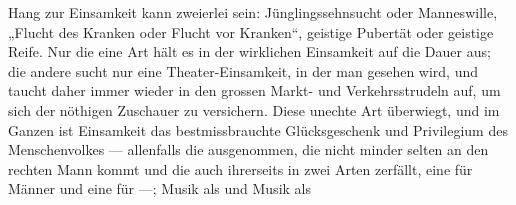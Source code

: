 Hang zur Einsamkeit kann zweierlei sein: Jünglingssehnsucht oder Manneswille, „Flucht des Kranken oder Flucht vor Kranken“, geistige Pubertät oder geistige Reife. Nur die eine Art hält es in der wirklichen Einsamkeit auf die Dauer aus; die andere sucht nur eine Theater-Einsamkeit, in der man gesehen wird, und taucht daher immer wieder in den grossen Markt- und Verkehrsstrudeln auf, um sich der nöthigen Zuschauer zu versichern. Diese unechte Art überwiegt, und im Ganzen ist Einsamkeit das bestmissbrauchte Glücksgeschenk und Privilegium des Menschenvolkes — allenfalls die  ausgenommen, die nicht minder selten an den rechten Mann kommt und die auch ihrerseits in zwei Arten zerfällt, eine für Männer und eine für —; Musik als  und Musik als 
\par

